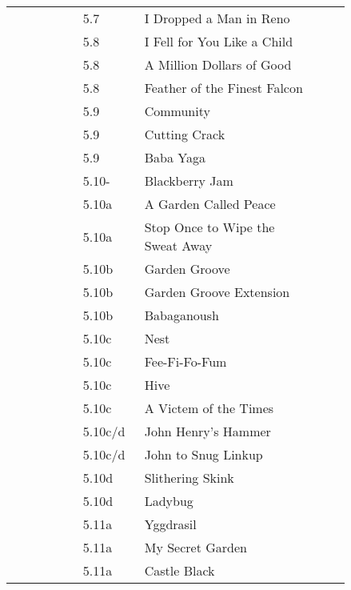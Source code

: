 \begin{flushleft}
\begin{center}
\begin{supertabular}{p{0.18\linewidth}p{0.13\linewidth}p{0.45\linewidth}p{0.08\linewidth}}
&5.7&I Dropped a Man in Reno & \pageref{rt:I Dropped a Man in Reno} \\
&5.8&I Fell for You Like a Child & \pageref{rt:I Fell for You Like a Child} \\
&5.8&A Million Dollars of Good & \pageref{rt:A Million Dollars of Good} \\
&5.8&Feather of the Finest Falcon & \pageref{rt:Feather of the Finest Falcon} \\
&5.9&Community & \pageref{rt:Community} \\
&5.9&Cutting Crack & \pageref{rt:Cutting Crack} \\
&5.9&Baba Yaga & \pageref{rt:Baba Yaga} \\
&5.10-&Blackberry Jam & \pageref{rt:Blackberry Jam} \\
&5.10a&A Garden Called Peace & \pageref{rt:A Garden Called Peace} \\
&5.10a&Stop Once to Wipe the Sweat Away & \pageref{rt:Stop Once to Wipe the Sweat Away} \\
&5.10b&Garden Groove & \pageref{rt:Garden Groove} \\
&5.10b&Garden Groove Extension & \pageref{vr:Garden Groove Extension} \\
&5.10b&Babaganoush & \pageref{rt:Babaganoush} \\
&5.10c&Nest & \pageref{rt:Nest} \\
&5.10c&Fee-Fi-Fo-Fum & \pageref{rt:Fee-Fi-Fo-Fum} \\
&5.10c&Hive & \pageref{rt:Hive} \\
&5.10c&A Victem of the Times & \pageref{vr:A Victem of the Times} \\
&5.10c/d&John Henry's Hammer & \pageref{rt:John Henry's Hammer} \\
&5.10c/d&John to Snug Linkup & \pageref{vr:John to Snug Linkup} \\
&5.10d&Slithering Skink & \pageref{rt:Slithering Skink} \\
&5.10d&Ladybug & \pageref{rt:Ladybug} \\
&5.11a&Yggdrasil & \pageref{rt:Yggdrasil} \\
&5.11a&My Secret Garden & \pageref{rt:My Secret Garden} \\
&5.11a&Castle Black & \pageref{rt:Castle Black} \\

\end{supertabular}
\end{center}
\end{flushleft}
